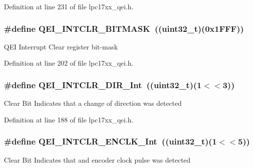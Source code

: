\-Definition at line 231 of file lpc17xx\-\_\-qei.\-h.

\hypertarget{group___q_e_i___private___macros_gac0347bf0f287d930f3cfede8731e1256}{
\subsubsection[{\-Q\-E\-I\-\_\-\-I\-N\-T\-C\-L\-R\-\_\-\-B\-I\-T\-M\-A\-S\-K}]{\setlength{\rightskip}{0pt plus 5cm}\#define {\bf \-Q\-E\-I\-\_\-\-I\-N\-T\-C\-L\-R\-\_\-\-B\-I\-T\-M\-A\-S\-K}~((uint32\-\_\-t)(0x1\-F\-F\-F))}}\label{group___q_e_i___private___macros_gac0347bf0f287d930f3cfede8731e1256}
\-Q\-E\-I \-Interrupt \-Clear register bit-\/mask 

\-Definition at line 202 of file lpc17xx\-\_\-qei.\-h.

\hypertarget{group___q_e_i___private___macros_gac8fc969b80f4c286a936b1ad564a6dde}{
\subsubsection[{\-Q\-E\-I\-\_\-\-I\-N\-T\-C\-L\-R\-\_\-\-D\-I\-R\-\_\-\-Int}]{\setlength{\rightskip}{0pt plus 5cm}\#define {\bf \-Q\-E\-I\-\_\-\-I\-N\-T\-C\-L\-R\-\_\-\-D\-I\-R\-\_\-\-Int}~((uint32\-\_\-t)(1$<$$<$3))}}\label{group___q_e_i___private___macros_gac8fc969b80f4c286a936b1ad564a6dde}
\-Clear \-Bit \-Indicates that a change of direction was detected 

\-Definition at line 188 of file lpc17xx\-\_\-qei.\-h.

\hypertarget{group___q_e_i___private___macros_ga0adac907e3c766082858255db7972570}{
\subsubsection[{\-Q\-E\-I\-\_\-\-I\-N\-T\-C\-L\-R\-\_\-\-E\-N\-C\-L\-K\-\_\-\-Int}]{\setlength{\rightskip}{0pt plus 5cm}\#define {\bf \-Q\-E\-I\-\_\-\-I\-N\-T\-C\-L\-R\-\_\-\-E\-N\-C\-L\-K\-\_\-\-Int}~((uint32\-\_\-t)(1$<$$<$5))}}\label{group___q_e_i___private___macros_ga0adac907e3c766082858255db7972570}
\-Clear \-Bit \-Indicates that and encoder clock pulse was detected 

